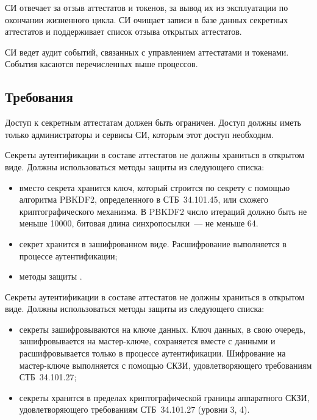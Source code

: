 СИ отвечает за отзыв аттестатов и токенов, за вывод их из эксплуатации по 
окончании жизненного цикла. 
%
СИ очищает записи в базе данных секретных аттестатов и поддерживает список 
отзыва открытых аттестатов.

СИ ведет аудит событий, связанных с управлением аттестатами и токенами. 
События касаются перечисленных выше процессов.

\subsection{Требования}\label{CM.Reqs}

Доступ к секретным аттестатам должен быть ограничен.
Доступ должны иметь только администраторы и сервисы СИ,
которым этот доступ необходим. 

Секреты аутентификации в составе аттестатов не должны храниться в открытом виде. 
Должны использоваться методы защиты из следующего списка:
\begin{itemize}
\item
вместо секрета хранится ключ, который строится по секрету с помощью 
алгоритма PBKDF2, определенного в СТБ~34.101.45, 
или схожего криптографического механизма.
%
В PBKDF2 число итераций должно быть не меньше 10000,
битовая длина синхропосылки~--- не меньше 64.

\item
секрет хранится в зашифрованном виде. Расшифрование 
выполняется в процессе аутентификации;

\item
методы защиты .
\end{itemize}

Секреты аутентификации в составе аттестатов не должны храниться в открытом 
виде. Должны использоваться методы защиты из следующего списка:
\begin{itemize}
\item
секреты зашифровываются на ключе данных. Ключ данных, в свою очередь, 
зашифровывается на мастер-ключе, сохраняется вместе с данными
и расшифровывается только в процессе аутентификации.
%
Шифрование на мастер-ключе выполняется с помощью СКЗИ, удовлетворяющего 
требованиям СТБ~34.101.27;

\item
секреты хранятся в пределах криптографической границы аппаратного
СКЗИ, удовлетворяющего требованиям СТБ~34.101.27 (уровни 3, 4).
\end{itemize}

